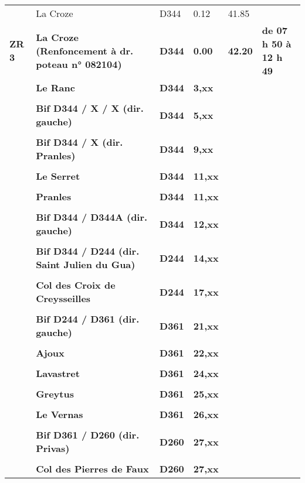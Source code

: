 \documentclass{article}%
\begin{document}
\begin{longtable}{p{2.25cm}|p{6.7cm}|p{2.0cm}|p{1.5cm}|p{1.5cm}|p{3.5cm}}
 &La Croze&D344 &0.12&41.85& \\%
\textbf{ZR 3}&\textbf{La Croze (Renfoncement à dr. poteau n° 082104)}&\textbf{D344 }&\textbf{0.00}&\textbf{42.20}&\textbf{de 07 h 50 à 12 h 49}\\%
 &\textbf{Le Ranc}&\textbf{D344 }&\textbf{3,xx}& & \\%
 & & & & & \\%
 &\textbf{Bif D344 / X / X (dir. gauche)}&\textbf{D344 }&\textbf{5,xx}& & \\%
 & & & & & \\%
 &\textbf{Bif D344 / X (dir. Pranles)}&\textbf{D344 }&\textbf{9,xx}& & \\%
 & & & & & \\%
 &\textbf{Le Serret}&\textbf{D344 }&\textbf{11,xx}& & \\%
 & & & & & \\%
 &\textbf{Pranles}&\textbf{D344 }&\textbf{11,xx}& & \\%
 & & & & & \\%
 &\textbf{Bif D344 / D344A (dir. gauche)}&\textbf{D344 }&\textbf{12,xx}& & \\%
 & & & & & \\%
 &\textbf{Bif D344 / D244 (dir. Saint Julien du Gua)}&\textbf{D244 }&\textbf{14,xx}& & \\%
 & & & & & \\%
 &\textbf{Col des Croix de Creysseilles}&\textbf{D244 }&\textbf{17,xx}& & \\%
 & & & & & \\%
 &\textbf{Bif D244 / D361 (dir. gauche)}&\textbf{D361 }&\textbf{21,xx}& & \\%
 & & & & & \\%
 &\textbf{Ajoux}&\textbf{D361 }&\textbf{22,xx}& & \\%
 & & & & & \\%
 &\textbf{Lavastret }&\textbf{D361 }&\textbf{24,xx}& & \\%
 & & & & & \\%
 &\textbf{Greytus}&\textbf{D361 }&\textbf{25,xx}& & \\%
 & & & & & \\%
 &\textbf{Le Vernas}&\textbf{D361 }&\textbf{26,xx}& & \\%
 & & & & & \\%
 &\textbf{Bif D361 / D260 (dir. Privas)}&\textbf{D260}&\textbf{27,xx}& & \\%
 & & & & & \\%
 &\textbf{Col des Pierres de Faux}&\textbf{D260}&\textbf{27,xx}& & \\%

\end{longtable}
\end{document}
